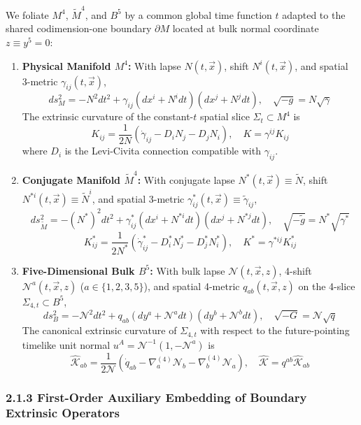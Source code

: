 \documentclass[aps,prd,onecolumn,superscriptaddress,nofootinbib,longbibliography,10pt]{revtex4-2}
\begin{document}
  We foliate \(M^4\), \(\tilde{M}^4\), and \(B^5\) by a common global time function \(t\) adapted to the shared codimension-one boundary \(\partial M\) located at bulk normal coordinate \(z \equiv y^5 = 0\):


  
\begin{enumerate}
    
\item \textbf{Physical Manifold \(M^4\):} With lapse \(N(t,\vec{x})\), shift \(N^i(t,\vec{x})\), and spatial 3-metric \(\gamma_{ij}(t,\vec{x})\),
    \[ ds_M^2 = -N^2 dt^2 + \gamma_{ij}(dx^i + N^i dt)(dx^j + N^j dt), \quad \sqrt{-g} = N\sqrt{\gamma} \]
    The extrinsic curvature of the constant-\(t\) spatial slice \(\Sigma_t \subset M^4\) is
    \[ K_{ij} = \frac{1}{2N}(\dot{\gamma}_{ij} - D_i N_j - D_j N_i), \quad K = \gamma^{ij}K_{ij} \]
    where \(D_i\) is the Levi-Civita connection compatible with \(\gamma_{ij}\).
    
\item \textbf{Conjugate Manifold \(\tilde{M}^4\):} With conjugate lapse \(N^*(t,\vec{x}) \equiv \tilde{N}\), shift \(N^{*i}(t,\vec{x}) \equiv \tilde{N}^i\), and spatial 3-metric \(\gamma^*_{ij}(t,\vec{x}) \equiv \tilde{\gamma}_{ij}\),
    \[ ds_{\tilde{M}}^2 = -(N^*)^2 dt^2 + \gamma^*_{ij}(dx^i + N^{*i}dt)(dx^j + N^{*j}dt), \quad \sqrt{-\tilde{g}} = N^*\sqrt{\gamma^*} \]
    \[ K^*_{ij} = \frac{1}{2N^*}(\dot{\gamma}^*_{ij} - D^*_i N^*_j - D^*_j N^*_i), \quad K^* = \gamma^{*ij}K^*_{ij} \]
    
\item \textbf{Five-Dimensional Bulk \(B^5\):} With bulk lapse \(\mathcal{N}(t,\vec{x},z)\), 4-shift \(\mathcal{N}^a(t,\vec{x},z)\) (\(a \in \{1,2,3,5\}\)), and spatial 4-metric \(q_{ab}(t,\vec{x},z)\) on the 4-slice \(\Sigma_{4,t} \subset B^5\),
    \[ ds_B^2 = -\mathcal{N}^2 dt^2 + q_{ab}(dy^a + \mathcal{N}^a dt)(dy^b + \mathcal{N}^b dt), \quad \sqrt{-G} = \mathcal{N}\sqrt{q} \]
    The canonical extrinsic curvature of \(\Sigma_{4,t}\) with respect to the future-pointing timelike unit normal \(u^A = \mathcal{N}^{-1}(1, -\mathcal{N}^a)\) is
    \[ \widehat{\mathcal{K}}_{ab} = \frac{1}{2\mathcal{N}}\left(\dot{q}_{ab} - \nabla^{(4)}_a \mathcal{N}_b - \nabla^{(4)}_b \mathcal{N}_a\right), \quad \widehat{\mathcal{K}} = q^{ab}\widehat{\mathcal{K}}_{ab} \]
  
\end{enumerate}


  
\subsubsection*{2.1.3 First-Order Auxiliary Embedding of Boundary Extrinsic Operators}
\end{document}
